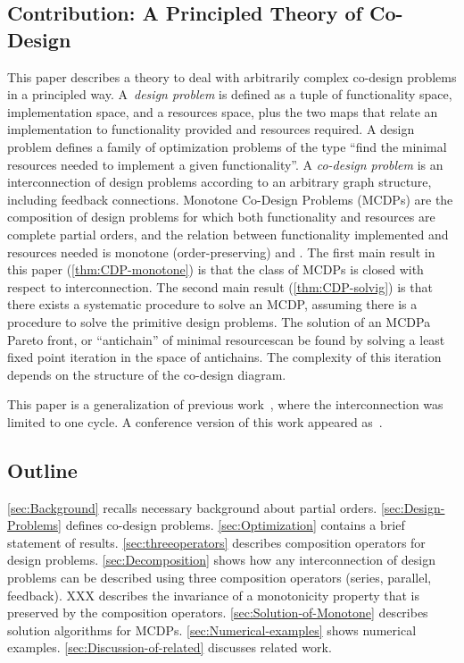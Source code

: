 \subsection{Contribution: A Principled Theory of Co-Design}

This paper describes a theory to deal with arbitrarily complex co-design
problems in a principled way. A~\emph{design problem} is defined
as a tuple of functionality space, implementation space, and a resources
space, plus the two maps that relate an implementation to functionality
provided and resources required. A design problem defines a family
of optimization problems of the type ``find the minimal resources
needed to implement a given functionality''. A \emph{co-design problem}
is an interconnection of design problems according to an arbitrary
graph structure, including feedback connections. Monotone Co-Design
Problems (MCDPs) are the composition of design problems for which
both functionality and resources are complete partial orders, and
the relation between functionality implemented and resources needed
is monotone (order-preserving) and \scottcontinuous. The first main
result in this paper (\cref{thm:CDP-monotone}) is that the
class of MCDPs is closed with respect to interconnection. The second
main result (\cref{thm:CDP-solvig}) is that there exists
a systematic procedure to solve an MCDP, assuming there is a procedure
to solve the primitive design problems. The solution of an MCDP\textemdash a
Pareto front, or ``antichain'' of minimal resources\textemdash can
be found by solving a least fixed point iteration in the space of
antichains. The complexity of this iteration depends on the structure
of the co-design diagram.

This paper is a generalization of previous work~\cite{censi15monotone},
where the interconnection was limited to one cycle. A conference
version of this work appeared as~\cite{censi15same}.

\subsection{Outline}

\cref{sec:Background} recalls necessary background about partial orders.
\cref{sec:Design-Problems} defines co-design problems. \cref{sec:Optimization}
contains a brief statement of results. \cref{sec:threeoperators} describes
composition operators for design problems. \cref{sec:Decomposition}
shows how any interconnection of design problems can be described
using three composition operators (series, parallel, feedback).
XXX
describes the invariance of a monotonicity property that is preserved
by the composition operators. \cref{sec:Solution-of-Monotone} describes
solution algorithms for MCDPs. \cref{sec:Numerical-examples} shows
numerical examples. \cref{sec:Discussion-of-related} discusses related
work.



